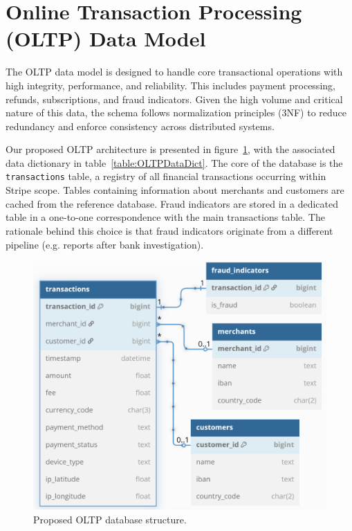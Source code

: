 \documentclass[11pt,a4paper,computermodern]{article}
\newcommand{\code}{\texttt}
\begin{document}
\clearpage
\section*{Online Transaction Processing (OLTP) Data Model}

The OLTP data model is designed to handle core transactional operations with high integrity, performance, and reliability. This includes payment processing, refunds, subscriptions, and fraud indicators. Given the high volume and critical nature of this data, the schema follows normalization principles (3NF) to reduce redundancy and enforce consistency across distributed systems.

Our proposed OLTP architecture is presented in figure~\ref{fig:OLTP}, with the associated data dictionary in table~\ref{table:OLTPDataDict}. The core of the database is the \code{transactions} table, a registry of all financial transactions occurring within Stripe scope. Tables containing information about merchants and customers are cached from the reference database. Fraud indicators are stored in a dedicated table in a one-to-one correspondence with the main transactions table. The rationale behind this choice is that fraud indicators originate from a different pipeline (e.g. reports after bank investigation).


\begin{figure}[!htb]
	\centering
	\includegraphics[scale=0.6]{./figures/OLTP}
	\caption{Proposed OLTP database structure.}
	\label{fig:OLTP}
\end{figure}
\end{document}
